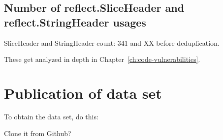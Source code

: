 
\subsection{Number of reflect.SliceHeader and reflect.StringHeader usages}\label{subsec:results-sliceheader}

SliceHeader and StringHeader count: 341 and XX before deduplication.

These get analyzed in depth in Chapter~\ref{ch:code-vulnerabilities}.



\section{Publication of data set}\label{sec:survey-publication}

To obtain the data set, do this:

Clone it from Github?
